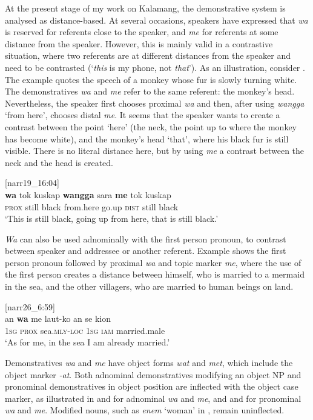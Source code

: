 \documentclass[output=paper,colorlinks,citecolor=brown]{langscibook}
\begin{document}
At the present stage of my work on Kalamang, the demonstrative system is analysed as distance-based. At several occasions, speakers have expressed that \textit{wa} is reserved for referents close to the speaker, and \textit{me} for referents at some distance from the speaker. However, this is mainly valid in a contrastive situation, where two referents are at different distances from the speaker and need to be contrasted (‘\textit{this} is my phone, not \textit{that}'). As an illustration, consider . The example quotes the speech of a monkey whose fur is slowly turning white. The demonstratives \textit{wa} and \textit{me} refer to the same referent: the monkey's head. Nevertheless, the speaker first chooses proximal \textit{wa} and then, after using \textit{wangga} ‘from here', chooses distal \textit{me}. It seems that the speaker wants to create a contrast between the point `here' (the neck, the point up to where the monkey has become white), and the monkey's head `that', where his black fur is still visible. There is no literal distance here, but by using \textit{me} a contrast between the neck and the head is created.

\ea \label{exe:kuskap} [narr19\_16:04]\\
\gll \textbf{wa} tok kuskap \textbf{wangga} sara \textbf{me} tok kuskap\\
\textsc{prox} still black from.here go.up \textsc{dist} still black\\
\glt `This is still black, going up from here, that is still black.' 
\z 

\textit{Wa} can also be used adnominally with the first person pronoun, to contrast between speaker and addressee or another referent. Example  shows the first person pronoun followed by proximal \textit{wa} and topic marker \textit{me}, where the use of the first person creates a distance between himself, who is married to a mermaid in the sea, and the other villagers, who are married to human beings on land.

\ea \label{exe:anwa} [narr26\_6:59]\\
\gll an \textbf{wa} me laut-ko an se kion\\
\textsc{1sg} \textsc{prox} {\glme} sea.\textsc{mly}-\textsc{loc} \textsc{1sg} \textsc{iam} married.male\\
\glt `As for me, in the sea I am already married.' 
\z 

Demonstratives \textit{wa} and \textit{me} have object forms \textit{wat} and \textit{met}, which include the object marker \textit{-at}. Both adnominal demonstratives modifying an object NP and pronominal demonstratives in object position are inflected with the object case marker, as illustrated in  and  for adnominal \textit{wa} and \textit{me}, and  and  for pronominal \textit{wa} and \textit{me}. Modified nouns, such as \textit{enem} `woman' in , remain uninflected.
\end{document}
